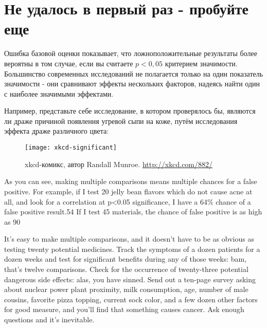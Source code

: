 \section[Не удалось в первый раз - пробуйте еще]{Не удалось в первый раз - пробуйте еще}
\label{chp5:try-again}

Ошибка базовой оценки показывает, что ложноположительные результаты более вероятны в том случае, если вы считаете $p < 0,05$ критерием значимости. Большинство современных исследований не полагается только на один показатель значимости - они сравнивают эффекты нескольких факторов, надеясь найти один с наиболее значимыми эффектами.

Например, представьте себе исследование, в котором проверялось бы, являются ли драже причиной появления угревой сыпи на коже, путём исследования эффекта драже различного цвета: %

\newpage %

\begin{figure}[h!]
    \centering
    \texttt{[image: xkcd-significant]}
    \caption{xkcd-комикс, автор Randall Munroe. \href{http://xkcd.com/882/}{http://xkcd.com/882/}}
    \label{fig5:xkcd-significant}
\end{figure}

As you can see, making multiple comparisons means multiple chances for a false positive. For example, if I test 20 jelly bean flavors which do not cause acne at all, and look for a correlation at p<0.05 significance, I have a 64\% chance of a false positive result.54 If I test 45 materials, the chance of false positive is as high as 90%

It’s easy to make multiple comparisons, and it doesn’t have to be as obvious as testing twenty potential medicines. Track the symptoms of a dozen patients for a dozen weeks and test for significant benefits during any of those weeks: bam, that’s twelve comparisons. Check for the occurrence of twenty-three potential dangerous side effects: alas, you have sinned. Send out a ten-page survey asking about nuclear power plant proximity, milk consumption, age, number of male cousins, favorite pizza topping, current sock color, and a few dozen other factors for good measure, and you’ll find that something causes cancer. Ask enough questions and it’s inevitable.

